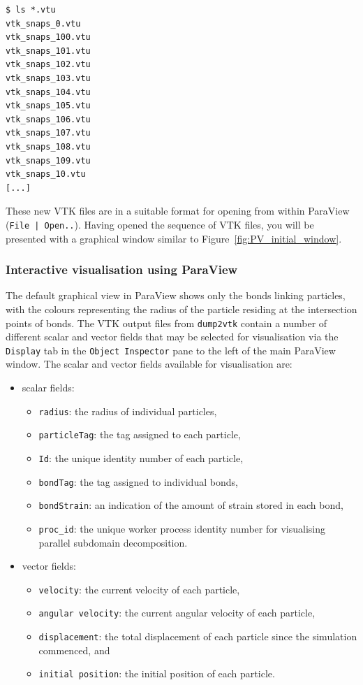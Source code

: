 \begin{verbatim}
$ ls *.vtu
vtk_snaps_0.vtu
vtk_snaps_100.vtu
vtk_snaps_101.vtu
vtk_snaps_102.vtu
vtk_snaps_103.vtu
vtk_snaps_104.vtu
vtk_snaps_105.vtu
vtk_snaps_106.vtu
vtk_snaps_107.vtu
vtk_snaps_108.vtu
vtk_snaps_109.vtu
vtk_snaps_10.vtu
[...]
\end{verbatim}

\noindent
These new VTK files are in a suitable format for opening from within ParaView (\texttt{File | Open..}). Having opened the sequence of VTK files, you will be presented with a graphical window similar to Figure~\ref{fig:PV_initial_window}. 

\subsubsection{Interactive visualisation using ParaView}

The default graphical view in ParaView shows only the bonds linking particles, with the colours representing the radius of the particle residing at the intersection points of bonds. The VTK output files from \texttt{dump2vtk} contain a number of different scalar and vector fields that may be selected for visualisation via the \texttt{Display} tab in the \texttt{Object Inspector} pane to the left of the main ParaView window. The scalar and vector fields available for visualisation are:

\begin{itemize}
   \item scalar fields:
   \begin{itemize}
      \item \texttt{radius}: the radius of individual particles,
      \item \texttt{particleTag}: the tag assigned to each particle,
      \item \texttt{Id}: the unique identity number of each particle,
      \item \texttt{bondTag}: the tag assigned to individual bonds,
      \item \texttt{bondStrain}: an indication of the amount of strain stored in each bond,
      \item \texttt{proc\_id}: the unique worker process identity number for visualising parallel subdomain decomposition.
   \end{itemize}
   \item vector fields:
   \begin{itemize}
      \item \texttt{velocity}: the current velocity of each particle,
      \item \texttt{angular velocity}: the current angular velocity of each particle,
      \item \texttt{displacement}: the total displacement of each particle since the simulation commenced, and
      \item \texttt{initial position}: the initial position of each particle.
   \end{itemize}
\end{itemize}

